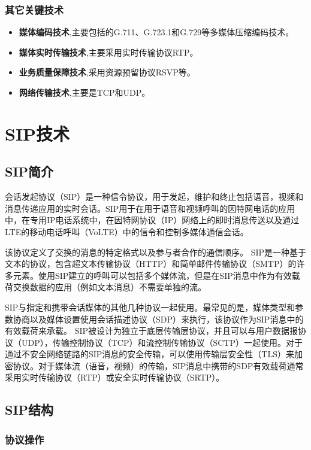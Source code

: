 \documentclass[a4paper,AutoFakeBold,oneside,12pt]{book}
\begin{document}
\subsubsection{其它关键技术}

\begin{itemize}
\item \textbf{媒体编码技术},主要包括的G.711、G.723.1和G.729等多媒体压缩编码技术。
\item \textbf{媒体实时传输技术},主要采用实时传输协议RTP。
\item \textbf{业务质量保障技术},采用资源预留协议RSVP等。
\item \textbf{网络传输技术},主要是TCP和UDP。
\end{itemize}

\section{SIP技术}
\subsection{SIP简介}
会话发起协议（SIP）是一种信令协议，用于发起，维护和终止包括语音，视频和消息传递应用的实时会话。SIP用于在用于语音和视频呼叫的因特网电话的应用中，在专用IP电话系统中，在因特网协议（IP）网络上的即时消息传送以及通过LTE的移动电话呼叫（VoLTE）中的信令和控制多媒体通信会话。

该协议定义了交换的消息的特定格式以及参与者合作的通信顺序。 SIP是一种基于文本的协议，包含超文本传输协议（HTTP）和简单邮件传输协议（SMTP）的许多元素。使用SIP建立的呼叫可以包括多个媒体流，但是在SIP消息中作为有效载荷交换数据的应用（例如文本消息）不需要单独的流。

SIP与指定和携带会话媒体的其他几种协议一起使用。最常见的是，媒体类型和参数协商以及媒体设置使用会话描述协议（SDP）来执行，该协议作为SIP消息中的有效载荷来承载。 SIP被设计为独立于底层传输层协议，并且可以与用户数据报协议（UDP），传输控制协议（TCP）和流控制传输协议（SCTP）一起使用。对于通过不安全网络链路的SIP消息的安全传输，可以使用传输层安全性（TLS）来加密协议。对于媒体流（语音，视频）的传输，SIP消息中携带的SDP有效载荷通常采用实时传输协议（RTP）或安全实时传输协议（SRTP）。

\subsection{SIP结构}
\subsubsection{协议操作}
\end{document}
